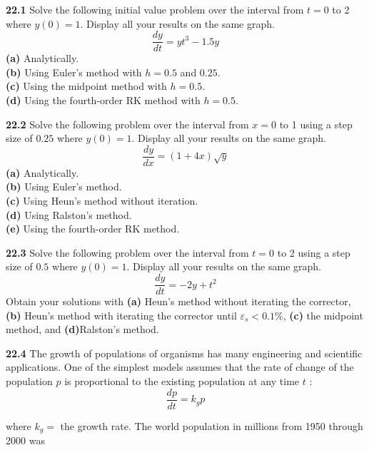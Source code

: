 \documentclass[../main.tex]{subfiles}
\begin{document}
\begin{multicols}{2}

    \noindent\textbf{22.1} Solve the following initial value problem over the interval from $t=0$ to 2 where $y(0)=1$. Display all your results on the same graph.
    $$
    \frac{d y}{d t}=y t^{3}-1.5 y
    $$
    \textbf{(a)} Analytically.\\
    \textbf{(b)} Using Euler's method with $h=0.5$ and $0.25$.\\
    \textbf{(c)} Using the midpoint method with $h=0.5$.\\
    \textbf{(d)} Using the fourth-order RK method with $h=0.5$.\vspace{2mm}

    \noindent\textbf{22.2} Solve the following problem over the interval from $x=0$ to 1 using a step size of $0.25$ where $y(0)=1$. Display all your results on the same graph.
    $$
    \frac{d y}{d x}=(1+4 x) \sqrt{y}
    $$
    \textbf{(a)} Analytically.\\
    \textbf{(b)} Using Euler's method.\\
    \textbf{(c)} Using Heun's method without iteration.\\
    \textbf{(d)} Using Ralston's method.\\
    \textbf{(e)} Using the fourth-order RK method.\vspace{2mm}

    \noindent\textbf{22.3} Solve the following problem over the interval from $t=0$ to 2 using a step size of $0.5$ where $y(0)=1$. Display all your results on the same graph.
    $$
    \frac{d y}{d t}=-2 y+t^{2}
    $$
    Obtain your solutions with \textbf{(a)} Heun's method without iterating the corrector, \textbf{(b)} Heun's method with iterating the corrector until $\varepsilon_{s}<0.1 \%$, \textbf{(c)} the midpoint method, and \textbf{(d)}Ralston's method.\vspace{2mm}

    \noindent\textbf{22.4} The growth of populations of organisms has many engineering and scientific applications. One of the simplest models assumes that the rate of change of the population $p$ is proportional to the existing population at any time $t$ :
    \begin{equation}
        \tag{P22.4.1}
        \frac{d p}{d t}=k_{g} p
    \end{equation}
    
    \noindent where $k_{g}=$ the growth rate. The world population in millions from 1950 through 2000 was
    

\end{multicols}
\end{document}
